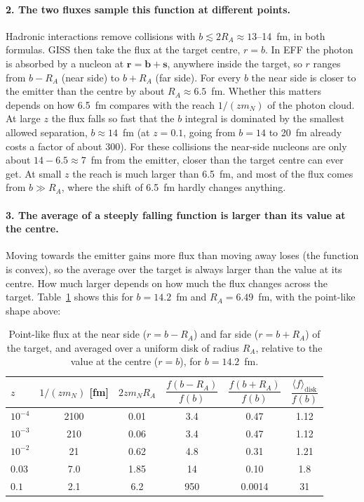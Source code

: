 \documentclass[11pt]{article}
\begin{document}
\paragraph{2. The two fluxes sample this function at different points.} Hadronic interactions
remove collisions with $b\lesssim 2R_A\approx 13$--14~fm, in both formulas. GISS then take the
flux at the target centre, $r=b$. In EFF the photon is absorbed by a nucleon at $\mathbf
r=\mathbf b+\mathbf s$, anywhere inside the target, so $r$ ranges from $b-R_A$ (near side) to
$b+R_A$ (far side). For every $b$ the near side is closer to the emitter than the centre by
about $R_A\approx 6.5$~fm. Whether this matters depends on how 6.5~fm compares with the reach
$1/(zm_N)$ of the photon cloud. At large $z$ the flux falls so fast that the $b$ integral is
dominated by the smallest allowed separation, $b\approx14$~fm (at $z=0.1$, going from $b=14$ to
20~fm already costs a factor of about 300). For these collisions the near-side nucleons are only
about $14-6.5\approx7$~fm from the emitter, closer than the target centre can ever get. At small
$z$ the reach is much larger than 6.5~fm, and most of the flux comes from $b\gg R_A$, where the
shift of 6.5~fm hardly changes anything.

\paragraph{3. The average of a steeply falling function is larger than its value at the
centre.} Moving towards the emitter gains more flux than moving away loses (the function is
convex), so the average over the target is always larger than the value at its centre. How much
larger depends on how much the flux changes across the target. Table~\ref{tab:sample} shows this
for $b=14.2$~fm and $R_A=6.49$~fm, with the point-like shape above:

\begin{table}[h]
\centering
\begin{tabular}{lccccc}
\toprule
$z$ & $1/(zm_N)$ [fm] & $2zm_NR_A$ & $\dfrac{f(b-R_A)}{f(b)}$ & $\dfrac{f(b+R_A)}{f(b)}$
  & $\dfrac{\langle f\rangle_{\text{disk}}}{f(b)}$ \\
\midrule
$10^{-4}$ & 2100 & 0.01 & 3.4 & 0.47 & 1.12 \\
$10^{-3}$ & 210  & 0.06 & 3.4 & 0.47 & 1.12 \\
$10^{-2}$ & 21   & 0.62 & 4.8 & 0.31 & 1.21 \\
$0.03$    & 7.0  & 1.85 & 14  & 0.10 & 1.8 \\
$0.1$     & 2.1  & 6.2  & 950 & 0.0014 & 31 \\
\bottomrule
\end{tabular}
\caption{Point-like flux at the near side ($r=b-R_A$) and far side ($r=b+R_A$) of the target,
and averaged over a uniform disk of radius $R_A$, relative to the value at the centre ($r=b$),
for $b=14.2$~fm.}
\label{tab:sample}
\end{table}
\end{document}
